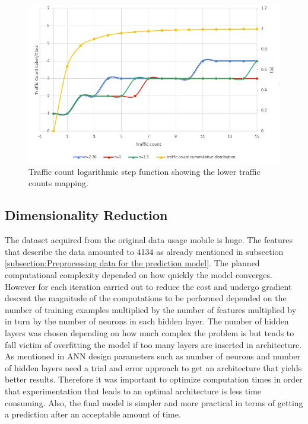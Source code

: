 \documentclass[12pt, a4paper]{report}
\theoremstyle{definition}
\theoremstyle{definition}%
\theoremstyle{definition}%
\theoremstyle{definition}%
\theoremstyle{definition}%
\theoremstyle{definition}%
\begin{document}
\begin{figure}[!]	
	\includegraphics[scale=0.70]{steps_function_zoom_in.jpg}
	\centering
	\caption{Traffic count logarithmic step function showing the lower traffic counts mapping. }
	\label{fig:label_classification_of_traffic_count_zoom_in}
\end{figure}


\subsection{Dimensionality Reduction}
The dataset acquired from the original data usage mobile is huge. The features that describe the data amounted to 4134 as already mentioned in subsection \ref{subsection:Preprocessing data for the prediction model}. The planned computational complexity depended on how quickly the model converges. However for each iteration carried out to reduce the cost and undergo gradient descent the magnitude of the computations to be performed depended on the number of training examples multiplied by the number of features multiplied by in turn by the number of neurons in each hidden layer. The number of hidden layers was chosen depending on how much complex the problem is but tends to fall victim of overfitting the model if too many layers are inserted in architecture. As mentioned in \cite{Jain1996} ANN design parameters such as number of neurons and number of hidden layers need a trial and error approach to get an architecture that yields better results. Therefore it was important to optimize computation times in order that experimentation that leads to an optimal architecture is less time consuming. Also, the final model is simpler and more practical in terms of getting a prediction after an acceptable amount of time.
\end{document}
